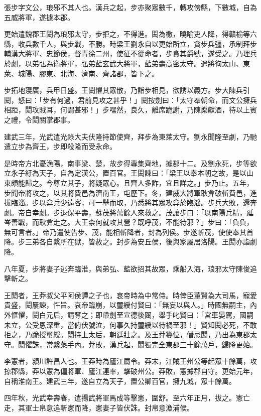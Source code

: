\begin{pinyinscope}
張步字文公，琅邪不其人也。漢兵之起，步亦聚眾數千，轉攻傍縣，下數城，自為五威將軍，遂據本郡。

更始遣魏郡王閎為琅邪太守，步拒之，不得進。閎為檄，曉喻吏人降，得贛榆等六縣，收兵數千人，與步戰，不勝。時梁王劉永自以更始所立，貪步兵彊，承制拜步輔漢大將軍、忠節侯，督青徐二州，使征不從命者，步貪其爵號，遂受之。乃理兵於劇，以弟弘為衛將軍，弘弟藍玄武大將軍，藍弟壽高密太守。遣將徇太山、東萊、城陽、膠東、北海、濟南、齊諸郡，皆下之。

步拓地寖廣，兵甲日盛。王閎懼其眾散，乃詣步相見，欲誘以義方。步大陳兵引閎，怒曰：「步有何過，君前見攻之甚乎！」閎按劍曰：「太守奉朝命，而文公擁兵相距，閎攻賊耳，何謂甚邪！」步嘿然，良久，離席跪謝，乃陳樂獻酒，待以上賓之禮，令閎關掌郡事。

建武三年，光武遣光祿大夫伏隆持節使齊，拜步為東萊太守。劉永聞隆至劇，乃馳遣立步為齊王，步即殺隆而受永命。

是時帝方北憂漁陽，南事梁、楚，故步得專集齊地，據郡十二。及劉永死，步等欲立永子紆為天子，自為定漢公，置百官。王閎諫曰：「梁王以奉本朝之故，是以山東頗能歸之。今尊立其子，將疑眾心。且齊人多詐，宜且詳之。」步乃止。五年，步聞帝將攻之，以其將費邑為濟南王，屯歷下。冬，建威大將軍耿弇破斬費邑，進拔臨淄。步以弇兵少遠客，可一舉而取，乃悉將其眾攻弇於臨淄。步兵大敗，還奔劇。帝自幸劇。步退保平壽，蘇茂將萬餘人來救之。茂讓步曰：「以南陽兵精，延岑善戰，而耿弇走之。大王柰何就攻其營？既呼茂，不能待邪？」步曰：「負負，無可言者。」帝乃遣使告步、茂，能相斬降者，封為列侯。步遂斬茂，使使奉其首降。步三弟各自繫所在獄，皆赦之。封步為安丘侯，後與家屬居洛陽。王閎亦詣劇降。

八年夏，步將妻子逃奔臨淮，與弟弘、藍欲招其故眾，乘船入海，琅邪太守陳俊追擊斬之。

王閎者，王莽叔父平阿侯譚之子也，哀帝時為中常侍。時倖臣董賢為大司馬，寵愛貴盛，閎屢諫，忤旨。哀帝臨崩，以璽綬付賢曰：「無妄以與人。」時國無嗣主，內外恇懼，閎白元后，請奪之；即帶劍至宣德後闥，舉手叱賢曰：「宮車晏駕，國嗣未立，公受恩深重，當俯伏號泣，何事久持璽綬以待禍至邪！」賢知閎必死，不敢拒之，乃跪授璽綬。閎持上太后，朝廷壯之。及王莽篡位，僭忌閎，乃出為東郡太守。閎懼誅，常繫藥手內。莽敗，漢兵起，閎獨完全東郡三十餘萬戶，歸降更始。

李憲者，潁川許昌人也。王莽時為廬江屬令。莽末，江賊王州公等起眾十餘萬，攻掠郡縣，莽以憲為偏將軍、廬江連率，擊破州公。莽敗，憲據郡自守。更始元年，自稱淮南王。建武三年，遂自立為天子，置公卿百官，擁九城，眾十餘萬。

四年秋，光武幸壽春，遣揚武將軍馬成等擊憲，圍舒。至六年正月，拔之。憲亡走，其軍士帛意追斬憲而降，憲妻子皆伏誅。封帛意漁浦侯。


\end{pinyinscope}
